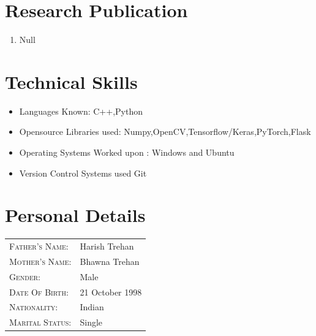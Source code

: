 \documentclass{my_cv}
\begin{document}
	\section{Research Publication}
	\begin{enumerate}
		\item Null
	\end{enumerate}
	\section{Technical Skills}
	\begin{itemize}
		\item Languages Known: C++,Python
		\item Opensource Libraries used: Numpy,OpenCV,Tensorflow/Keras,PyTorch,Flask
		\item Operating Systems Worked upon : Windows and Ubuntu
		\item Version Control Systems used Git
	\end{itemize}
    \section{Personal Details}
 
 	\begin{tabular}{ll}
    	\textsc{Father's Name:} & Harish Trehan \\
    	\textsc{Mother's Name:}       & Bhawna Trehan \\
    	\textsc{Gender:}         & Male \\
    	\textsc{Date Of Birth:}         & 21 October 1998 \\
    	\textsc{Nationality:}   & Indian \\
    	\textsc{Marital Status:} & Single \\
    \end{tabular}
	
\end{document}
